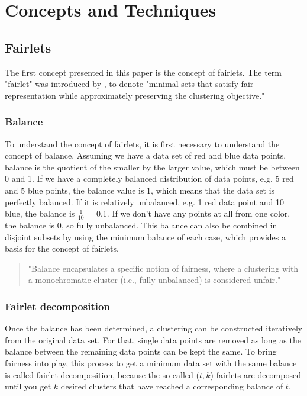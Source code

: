 \section{Concepts and Techniques}


\subsection{Fairlets}
\label{fairlets}

The first concept presented in this paper is the concept of fairlets. The term "fairlet" was introduced by  \textcite[]{Chierichetti2018}, to denote "minimal sets that satisfy fair representation
while approximately preserving the clustering objective." \autocite[1]{Chierichetti2018}

\subsubsection{Balance}

To understand the concept of fairlets, it is first necessary to understand the concept of balance. Assuming we have a data set of red and blue data points, balance is the quotient of the smaller by the larger value, which must be between 0 and 1. If we have a completely balanced distribution of data points, e.g. 5 red and 5 blue points, the balance value is 1, which means that the data set is perfectly balanced. If it is relatively unbalanced, e.g. 1 red data point and 10 blue, the balance is $\frac{1}{10}$ = 0.1. If we don't have any points at all from one color, the balance is 0, so fully unbalanced. This balance can also be combined in disjoint subsets by using the minimum balance of each case, which provides a basis for the concept of fairlets. \autocite[4]{Chierichetti2018}

\begin{quote}
"Balance encapsulates a specific notion of fairness, where a clustering with a monochromatic cluster (i.e., fully unbalanced) is considered unfair."

\autocite[4]{Chierichetti2018}
\end{quote}

\subsubsection{Fairlet decomposition}

Once the balance has been determined, a clustering can be constructed iteratively from the original data set. For that, single data points are removed as long as the balance between the remaining data points can be kept the same. To bring fairness into play, this process to get a minimum data set with the same balance is called fairlet decomposition, because the so-called ($t, k$)-fairlets are decomposed until you get $k$ desired clusters that have reached a corresponding balance of $t$. \autocite[4]{Chierichetti2018}

